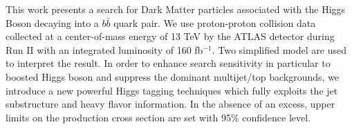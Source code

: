 
This work presents a search for Dark Matter particles associated with the Higgs Boson decaying into a $b\bar{b}$ quark pair. We use  
proton-proton collision data collected at a center-of-mass energy of 13 TeV by the ATLAS detector during Run II with an integrated luminosity of 160 fb$^{-1}$.
Two simplified model are used to interpret the result. In order to enhance search sensitivity in 
particular to boosted Higgs boson and suppress the dominant multijet/top backgrounds, we introduce a new powerful Higgs tagging techniques which fully exploits the jet substructure and heavy flavor information. 
 In the absence of an excess, upper limits on the production cross section are set with 95\% confidence level.


